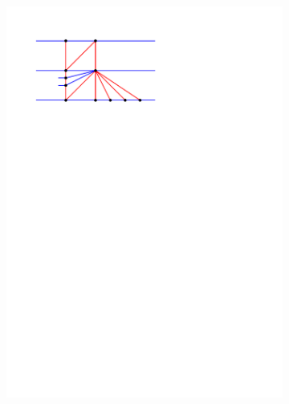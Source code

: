 \begin{figure}[!b]
    \centering
    \begin{subfigure}[t]{0.23 \textwidth}
        \includegraphics[width = \textwidth]{topFanFlips/img/newFlip/aBigBefore}
    \end{subfigure}
    ~
    \begin{subfigure}[t]{0.23 \textwidth}

\end{subfigure}
\end{figure}
